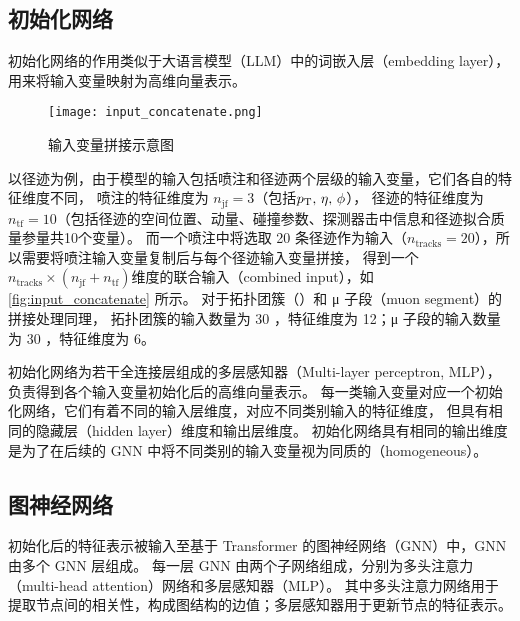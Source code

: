 \subsection{初始化网络}
初始化网络的作用类似于大语言模型（LLM）中的词嵌入层（embedding layer），用来将输入变量映射为高维向量表示。

\begin{figure}[ht]
    \centering
    \texttt{[image: input\_concatenate.png]}
    \caption{输入变量拼接示意图}
    \label{fig:input_concatenate}
\end{figure}

以径迹为例，由于模型的输入包括喷注和径迹两个层级的输入变量，它们各自的特征维度不同，
喷注的特征维度为 $n_\text{jf}=3$（包括$p_{\text{T}} ,\,  \eta,\, \phi$），
径迹的特征维度为 $n_\text{tf}=10$（包括径迹的空间位置、动量、碰撞参数、探测器击中信息和径迹拟合质量参量共10个变量）。
而一个喷注中将选取 20 条径迹作为输入（$n_\text{tracks}=20$），所以需要将喷注输入变量复制后与每个径迹输入变量拼接，
得到一个$n_\text{tracks} \times (n_\text{jf} + n_\text{tf})$维度的联合输入（combined input），如\autoref{fig:input_concatenate} 所示。
对于拓扑团簇（\topo）和 μ 子段（muon segment）的拼接处理同理，
拓扑团簇的输入数量为 30 ，特征维度为 12；μ 子段的输入数量为 30 ，特征维度为 6。

初始化网络为若干全连接层组成的多层感知器（Multi-layer perceptron, MLP），负责得到各个输入变量初始化后的高维向量表示。
每一类输入变量对应一个初始化网络，它们有着不同的输入层维度，对应不同类别输入的特征维度，
但具有相同的隐藏层（hidden layer）维度和输出层维度。
初始化网络具有相同的输出维度是为了在后续的 GNN 中将不同类别的输入变量视为同质的（homogeneous）。


\subsection{图神经网络}
初始化后的特征表示被输入至基于 Transformer 的图神经网络（GNN）中，GNN 由多个 GNN 层组成。
每一层 GNN 由两个子网络组成，分别为多头注意力（multi-head attention）网络和多层感知器（MLP）。
其中多头注意力网络用于提取节点间的相关性，构成图结构的边值；多层感知器用于更新节点的特征表示。

